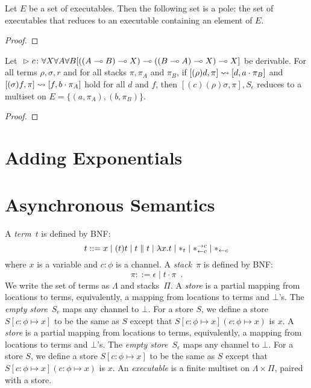 \begin{proposition}
 Let $E$ be a set of executables.
 Then the following set is a pole: the set of executables that reduces to
 an executable containing an element of $E$.
\end{proposition}
\begin{proof}
\end{proof}

\begin{proposition}
 Let
 ${}\vartriangleright{}{ {c} \colon{\forall X\forall A\forall B
 [((A\multimap B)\multimap X)
  \multimap((B\multimap A)\multimap X)
  \multimap X]} }$
 be
 derivable.
 For all terms $\rho,\sigma, r$ and for all stacks $\pi, \pi_A$ and
 $\pi_B$,
 if $[(\rho)d  ,\pi]\rightsquigarrow [d,a\cdot \pi_B]$ and
    $[(\sigma)f,\pi]\rightsquigarrow [f,b\cdot \pi_A]$ hold for all $d$ and $f$,
 then
 $[(c)(\rho)\sigma,\pi],S_\epsilon$ reduces to a multiset on
 $E = \{(a,\pi_A),(b,\pi_B)\}$.
\end{proposition}
\begin{proof}
\end{proof}

\section{Adding Exponentials}


\section{Asynchronous Semantics}

A \textit{term}~$t$ is defined by BNF:
\[
 t::= x
 \mid (t)t
 \mid t\parallel t
 \mid \lambda x.t
 \mid \ast_t
 \mid \ast^{\rightarrow {c}}_{\leftarrow{c}}
 \mid \ast_{\leftarrow{c}}
\]
where $x$ is a variable and $c\colon\phi$ is a channel.
A \textit{stack}~$\pi$ is defined by BNF:
\[
 \pi ::= \epsilon
 \mid t\cdot \pi
 \enspace.
\]
We write the set of terms as $\Lambda$ and stacks~$\Pi$.
A \textit{store} is a partial mapping from locations to
terms, equivalently, a mapping from locations to terms and $\bot$'s.
The \textit{empty store}~$S_\epsilon$ maps any channel to $\bot$.
For a store $S$, we define a store $S[c\colon\phi\mapsto x]$ to be
the same as $S$ except that $S[c\colon\phi\mapsto x](c\colon\phi\mapsto
x)$ is $x$.
A \textit{store} is a partial mapping from locations to
terms, equivalently, a mapping from locations to terms and $\bot$'s.
The \textit{empty store}~$S_\epsilon$ maps any channel to $\bot$.
For a store $S$, we define a store $S[c\colon\phi\mapsto x]$ to be
the same as $S$ except that $S[c\colon\phi\mapsto x](c\colon\phi\mapsto
x)$ is $x$.
An \textit{executable} is a finite multiset on $\Lambda \times \Pi$,
paired with a store.

